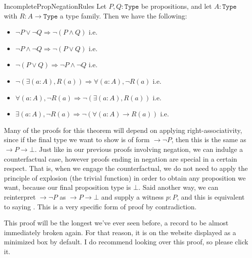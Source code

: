 \documentclass[11pt]{article}
\begin{document}
\begin{label theorem}{IncompletePropNegationRules}
Let $P,Q \colon \mathtt{Type}$ be propositions, and let $A \colon \mathtt{Type}$ with $R\colon A \to \mathtt{Type}$ a type family. Then we have the following:\begin{itemize}
\item $\neg P \vee \neg Q \Rightarrow \neg (P \wedge Q)$ i.e. 
\item $\neg P \wedge \neg Q \Rightarrow \neg (P \vee Q)$ i.e. 
\item $\neg (P \vee Q) \Rightarrow \neg P \wedge \neg Q$ i.e. 
\item $\neg (\exists (a \colon A), R(a)) \Rightarrow \forall (a \colon A), \neg R(a)$ i.e. 
\item $\forall (a \colon A), \neg R(a) \Rightarrow \neg (\exists (a \colon A), R(a))$ i.e. 
\item $ \exists (a : A), \neg R(a) \Rightarrow \neg (\forall (a : A) \to R(a))$ i.e. 
\end{itemize}
\end{label theorem}

Many of the proofs for this theorem will depend on applying right-associativity, since if the final type we want to show is of form $\to \neg P$, then this is the same as $\to P \to \bot$. Just like in our previous proofs involving negation, we can indulge a counterfactual case, however proofs ending in negation are special in a certain respect. That is, when we engage the counterfactual, we do not need to apply the principle of explosion (the trivial function) in order to obtain any proposition we want, because our final proposition type is $\bot$. Said another way, we can reinterpret $\to \neg P$ as $\to P \to \bot$ and supply a witness $p \colon P$, and this is equivalent to saying . This is a very specific form of proof by contradiction.

This proof will be the longest we've ever seen before, a record to be almost immediately broken again. For that reason, it is on the website displayed as a minimized box by default. I do recommend looking over this proof, so please click it.
\end{document}
